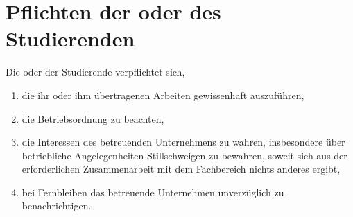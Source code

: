 \section{Pflichten der oder des Studierenden}

Die oder der Studierende verpflichtet sich,
\begin{enumerate}
\item die ihr oder ihm übertragenen Arbeiten gewissenhaft auszuführen,
\item die Betriebsordnung zu beachten,
\item die Interessen des betreuenden Unternehmens zu wahren, insbesondere über betriebliche Angelegenheiten Stillschweigen zu bewahren, soweit sich aus der erforderlichen Zusammenarbeit mit dem Fachbereich \departement nichts anderes ergibt,
\item bei Fernbleiben das betreuende Unternehmen unverzüglich zu benachrichtigen.
\end{enumerate}